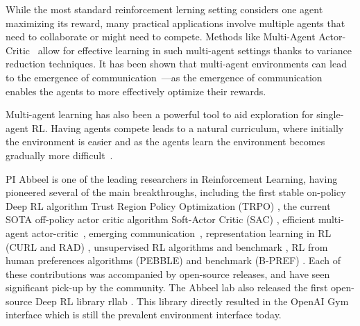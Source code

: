 \documentclass{NSF}
\begin{document}
While the most standard reinforcement lerning setting considers one agent maximizing its reward, many practical applications involve multiple agents that need to collaborate or might need to compete.
Methods like Multi-Agent Actor-Critic~\cite{lowe2017multiagent} allow for effective learning in such multi-agent settings thanks to variance reduction techniques.
It has been shown that multi-agent environments can lead to the emergence of communication~\cite{foerster2016learning, sukhbaatar2016learning, lazaridou2016multi, mordatch2017emergence}---as the emergence of communication enables the agents to more effectively optimize their rewards.

Multi-agent learning has also been a powerful tool to aid exploration for single-agent RL.
Having agents compete leads to a natural curriculum, where initially the environment is easier and as the agents learn the environment becomes gradually more difficult~\cite{sukhbaatar2017intrinsic,florensa2018automatic,racaniere2019automated,openai2021asymmetric,dennis2020emergent}.


PI Abbeel is one of the leading researchers in Reinforcement Learning, having pioneered several of the main breakthroughs, including the first stable on-policy Deep RL algorithm Trust Region Policy Optimization (TRPO) \cite{schulman2015trust}, the current SOTA off-policy actor critic algorithm Soft-Actor Critic (SAC) \cite{haarnoja2018soft}, efficient multi-agent actor-critic~\cite{lowe2017multiagent}, emerging communication~\cite{mordatch2017emergence}, representation learning in RL (CURL and RAD) \cite{misha20curl,RAD}, unsupervised RL algorithms and benchmark \cite{URLB}, RL from human preferences algorithms (PEBBLE) \cite{pebble} and benchmark (B-PREF) \cite{lee2021bpref}.
Each of these contributions was accompanied by open-source releases, and have seen significant pick-up by the community.
The Abbeel lab also released the first open-source Deep RL library rllab \cite{duan2016benchmarking}.
This library directly resulted in the OpenAI Gym interface \cite{openaigym} which is still the prevalent environment interface today.


\newpage
\renewcommand\refname{References Cited}


\end{document}
